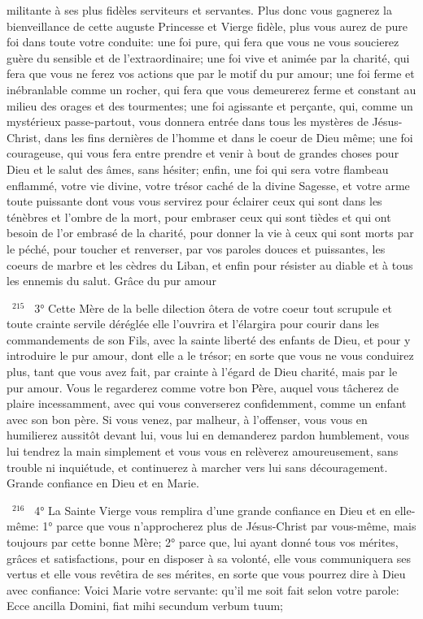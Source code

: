 \documentclass[paper=a5,pagesize=pdftex,fontsize=15pt,headinclude=on,twoside=off]{scrbook}
\newcommand{\negphantom}[1]{\settowidth{\dimen0}{#1}\hspace*{-\dimen0}}
\newcommand{\versenb}[1]{\par \vspace{10pt}~\negphantom{~${}^{#1}$~}${}^{#1}$~}
\begin{document}
militante à ses plus fidèles serviteurs et servantes. Plus donc vous gagnerez la bienveillance de cette auguste
Princesse et Vierge fidèle, plus vous aurez de pure foi dans toute votre conduite: une foi pure, qui fera que vous ne
vous soucierez guère du sensible et de l'extraordinaire; une foi vive et animée par la charité, qui fera que vous ne
ferez vos actions que par le motif du pur amour; une foi ferme et inébranlable comme un rocher, qui fera que vous
demeurerez ferme et constant au milieu des orages et des tourmentes; une foi agissante et perçante, qui, comme
un mystérieux passe-partout, vous donnera entrée dans tous les mystères de Jésus-Christ, dans les fins dernières
de l'homme et dans le coeur de Dieu même; une foi courageuse, qui vous fera entre prendre et venir à bout de
grandes choses pour Dieu et le salut des âmes, sans hésiter; enfin, une foi qui sera votre flambeau enflammé,
votre vie divine, votre trésor caché de la divine Sagesse, et votre arme toute puissante dont vous vous servirez
pour éclairer ceux qui sont dans les ténèbres et l'ombre de la mort, pour embraser ceux qui sont tièdes et qui ont
besoin de l'or embrasé de la charité, pour donner la vie à ceux qui sont morts par le péché, pour toucher et
renverser, par vos paroles douces et puissantes, les coeurs de marbre et les cèdres du Liban, et enfin pour
résister au diable et à tous les ennemis du salut.
Grâce du pur amour
\versenb{215} 3° Cette Mère de la belle dilection ôtera de votre coeur tout scrupule et toute crainte servile déréglée elle
l'ouvrira et l'élargira pour courir dans les commandements de son Fils, avec la sainte liberté des enfants de Dieu,
et pour y introduire le pur amour, dont elle a le trésor; en sorte que vous ne vous conduirez plus, tant que vous
avez fait, par crainte à l'égard de Dieu charité, mais par le pur amour. Vous le regarderez comme votre bon Père,
auquel vous tâcherez de plaire incessamment, avec qui vous converserez confidemment, comme un enfant avec
son bon père. Si vous venez, par malheur, à l'offenser, vous vous en humilierez aussitôt devant lui, vous lui en
demanderez pardon humblement, vous lui tendrez la main simplement et vous vous en relèverez amoureusement,
sans trouble ni inquiétude, et continuerez à marcher vers lui sans découragement.
Grande confiance en Dieu et en Marie.
\versenb{216} 4° La Sainte Vierge vous remplira d'une grande confiance en Dieu et en elle-même:
1° parce que vous n'approcherez plus de Jésus-Christ par vous-même, mais toujours par cette bonne Mère;
2° parce que, lui ayant donné tous vos mérites, grâces et satisfactions, pour en disposer à sa volonté, elle vous communiquera ses vertus et elle vous revêtira de ses mérites, en sorte que vous pourrez dire à Dieu avec confiance: Voici Marie votre servante: qu'il me soit fait selon votre parole: Ecce ancilla Domini, fiat mihi secundum verbum tuum;
\end{document}
